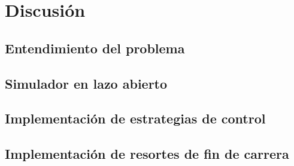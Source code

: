 \section{Discusión}

\subsection{Entendimiento del problema}

\subsection{Simulador en lazo abierto}

\subsection{Implementación de estrategias de control}



\subsection{Implementación de resortes de fin de carrera}
